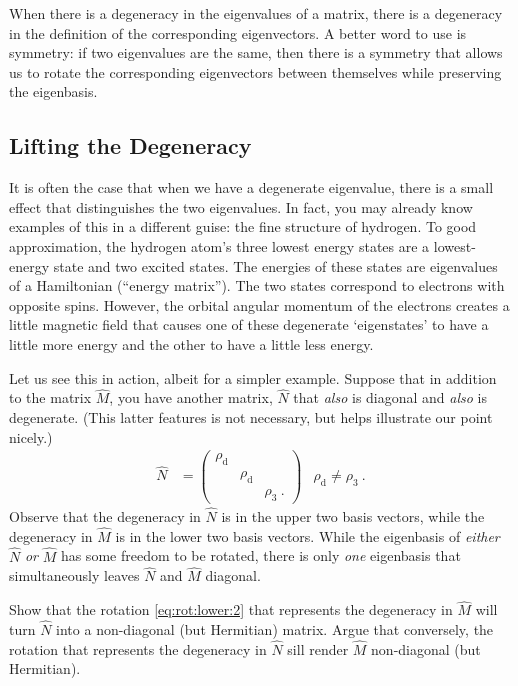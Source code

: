 \documentclass[12pt, oneside]{report}    %
\begin{document}
\begin{bigidea}
When there is a degeneracy in the eigenvalues of a matrix, there is a degeneracy in the definition of the corresponding eigenvectors. A better word to use is symmetry: if two eigenvalues are the same, then there is a symmetry that allows us to rotate the corresponding eigenvectors between themselves while preserving the eigenbasis.
\end{bigidea}

\subsection*{Lifting the Degeneracy}

It is often the case that when we have a degenerate eigenvalue, there is a small effect that distinguishes the two eigenvalues. In fact, you may already know examples of this in a different guise: the fine structure of hydrogen. To good approximation, the hydrogen atom's three lowest energy states are a lowest-energy  state and two excited  states. The energies of these states are eigenvalues of a Hamiltonian (``energy matrix''). The two  states correspond to electrons with opposite spins. However, the orbital angular momentum of the electrons creates a little magnetic field that causes one of these degenerate `eigenstates' to have a little more energy and the other to have a little less energy. 

Let us see this in action, albeit for a simpler example. Suppose that in addition to the matrix $\hat M$, you have another matrix, $\hat N$ that \emph{also} is diagonal and \emph{also} is degenerate. (This latter features is not necessary, but helps illustrate our point nicely.) 
\begin{align} 
    \hat N &= 
    \begin{pmatrix}
        \rho_\text{d} & & \\
        & \rho_\text{d} & \\
        & & \rho_3 \ .
    \end{pmatrix}
    &
    \rho_\text{d}  \neq \rho_3\ .
    \label{eq:degenerate:eigenvalue:diagonal:too} 
\end{align}
Observe that the degeneracy in $\hat N$ is in the upper two basis vectors, while the degeneracy in $\hat M$ is in the lower two basis vectors. While the eigenbasis of \emph{either} $\hat N$ \emph{or} $\hat M$ has some freedom to be rotated, there is only \emph{one} eigenbasis that simultaneously leaves $\hat N$ and $\hat M$ diagonal.
\begin{exercise}
Show that the rotation \eqref{eq:rot:lower:2} that represents the degeneracy in $\hat M$ will turn $\hat N$ into a non-diagonal (but Hermitian) matrix. Argue that conversely, the rotation that represents the degeneracy in $\hat N$ sill render $\hat M$ non-diagonal (but Hermitian).
\end{exercise}
\end{document}
